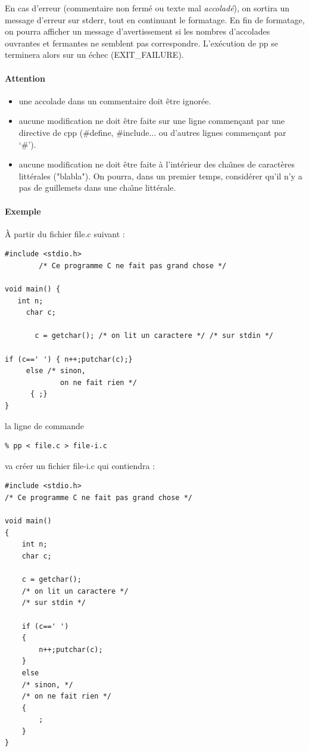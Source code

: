 \documentclass[12pts]{article}
\begin{document}
En cas d'erreur (commentaire non ferm\'e ou texte mal
\textit{accolad\'e}), on sortira un message d'erreur sur stderr, tout
en continuant le formatage. En fin de formatage, on pourra afficher un
message d'avertissement si les nombres d'accolades ouvrantes et
fermantes ne semblent pas correspondre. L'ex\'ecution de pp se
terminera alors sur un \'echec (EXIT\_FAILURE).

\paragraph{Attention}
\begin{itemize}
\item une accolade dans un commentaire doit \^etre ignor\'ee.
\item aucune modification ne doit \^etre faite sur une ligne commen\c{c}ant
  par une directive de cpp (\#define, \#include... ou d'autres lignes
  commen\c{c}ant par `\#').
\item aucune modification ne doit \^etre faite \`a l'int\'erieur des cha\^\i{}nes
  de caract\`eres litt\'erales ("blabla"). On pourra, dans un premier
  temps, consid\'erer qu'il n'y a pas de guillemets dans une cha\^\i{}ne
  litt\'erale.
\end{itemize}

\paragraph{Exemple}
\`A partir du fichier file.c suivant :
\begin{verbatim}
#include <stdio.h>
        /* Ce programme C ne fait pas grand chose */

void main() {
   int n;
     char c;
        
       c = getchar(); /* on lit un caractere */ /* sur stdin */

if (c==' ') { n++;putchar(c);}
     else /* sinon,
             on ne fait rien */
      { ;}
}
\end{verbatim}
la ligne de commande
\begin{verbatim}
% pp < file.c > file-i.c
\end{verbatim}
va cr\'eer un fichier file-i.c qui contiendra :
\begin{verbatim}
#include <stdio.h>
/* Ce programme C ne fait pas grand chose */

void main()
{
    int n;
    char c;

    c = getchar();
    /* on lit un caractere */
    /* sur stdin */

    if (c==' ')
    {
        n++;putchar(c);
    }
    else
    /* sinon, */
    /* on ne fait rien */
    {
        ;
    }
}
\end{verbatim}
  
\end{document}
